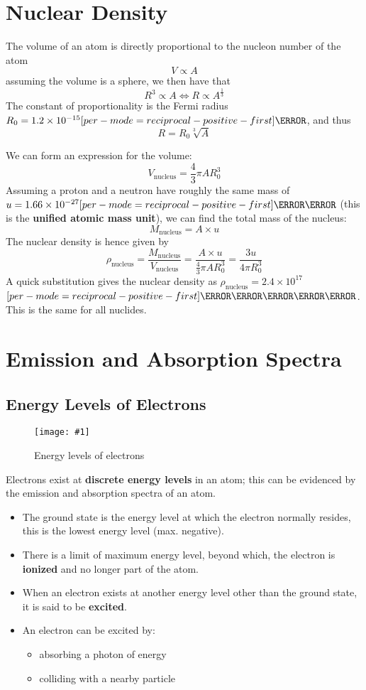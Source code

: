 \documentclass[a4paper,12pt]{article}
\let\oldsection\section
\renewcommand\section{\clearpage\oldsection}
\let\oldsi\si
\renewcommand{\si}[1]{\oldsi[per-mode=reciprocal-positive-first]{#1}}
\newcommand{\img}[4]{\begin{center}
  \begin{figure}[H]
    \centering
    \texttt{[image: \#1]}
    \caption{#3}
    \label{fig:#4}
  \end{figure}
\end{center}}
\begin{document}
\section{Nuclear Density}

The volume of an atom is directly proportional to the nucleon number of the atom
$$V \propto A$$
assuming the volume is a sphere, we then have that
$$R^3 \propto A \iff R \propto A^{\frac{1}{3}}$$
The constant of proportionality is the Fermi radius $R_0 = 1.2 \times 10^{-15}\si{\meter}$, and thus
$$R = R_0\sqrt[3]{A}$$

We can form an expression for the volume:
$$V_{\text{nucleus}} = \frac{4}{3}\pi A R_0^3$$
Assuming a proton and a neutron have roughly the same mass of $u = 1.66 \times 10^{-27}\si{\kilo\gram}$ (this is the \textbf{unified atomic mass unit}), we can find the total mass of the nucleus:
$$M_{\text{nucleus}} = A \times u$$
The nuclear density is hence given by
$$\rho_{\text{nucleus}} = \frac{M_{\text{nucleus}}}{V_{\text{nucleus}}} = \frac{A \times u}{\frac{4}{3}\pi A R_0^3} = \frac{3u}{4\pi R_0^3}$$
A quick substitution gives the nuclear density as $\rho_{\text{nucleus}} = 2.4 \times 10^{17}$ $\si{\kilo\gram\per\meter\cubed}$. This is the same for all nuclides.


\section{Emission and Absorption Spectra}

\subsection{Energy Levels of Electrons}

\img{energylevel.jpg}{0.5}{Energy levels of electrons}{energylevel}

Electrons exist at \textbf{discrete energy levels} in an atom; this can be evidenced by the emission and absorption spectra of an atom.
\begin{itemize}
  \item The ground state is the energy level at which the electron normally resides, this is the lowest energy level (max. negative).
  \item There is a limit of maximum energy level, beyond which, the electron is \textbf{ionized} and no longer part of the atom.
  \item When an electron exists at another energy level other than the ground state, it is said to be \textbf{excited}.
  \item An electron can be excited by:
        \begin{itemize}
          \item absorbing a photon of energy
          \item colliding with a nearby particle
        \end{itemize}
\end{itemize}
\end{document}
